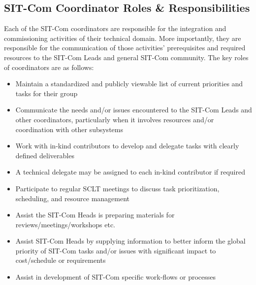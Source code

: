 \documentclass[SE,lsstdraft,authoryear,toc]{lsstdoc, lsstdraft}
\begin{document}
\subsection{SIT-Com Coordinator Roles \& Responsibilities}
\label{sec:coordinator_r_and_rs}
Each of the SIT-Com coordinators are responsible for the integration and commissioning activities of their technical domain.
More importantly, they are responsible for the communication of those activities' prerequisites and required resources to the SIT-Com Leads and general SIT-Com community.
The key roles of coordinators are as follows:
\begin{itemize}
    \item Maintain a standardized and publicly viewable list of current priorities and tasks for their group
    \item Communicate the needs and/or issues encountered to the SIT-Com Leads and other coordinators, particularly when it involves resources and/or coordination with other subsystems
    \item Work with in-kind contributors to develop and delegate tasks with clearly defined deliverables
    \item A technical delegate may be assigned to each in-kind contributor if required
    \item Participate to regular SCLT meetings to discuss task prioritization, scheduling, and resource management
    \item Assist the SIT-Com Heads is preparing materials for reviews/meetings/workshops etc.
    \item Assist SIT-Com Heads by supplying information to better inform the global priority of SIT-Com tasks and/or issues with significant impact to cost/schedule or requirements
    \item Assist in development of SIT-Com specific work-flows or processes
\end{itemize}
\end{document}
